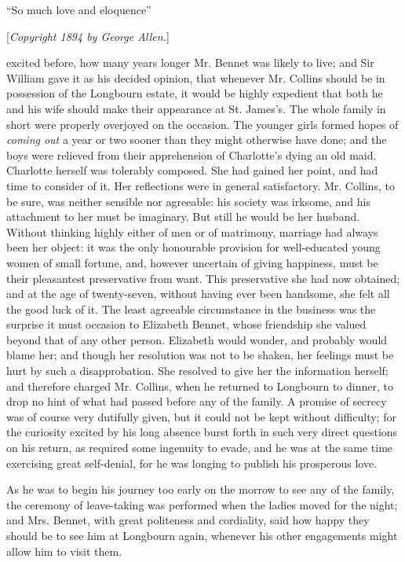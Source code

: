 \documentclass[12pt,openright]{book}
\begin{document}
“So much love and eloquence”

[\textit{Copyright 1894 by George Allen.}]

excited before, how many years longer Mr. Bennet was likely to live; and Sir William gave it as his decided opinion, that whenever Mr. Collins should be in possession of the Longbourn estate, it would be highly expedient that both he and his wife should make their appearance at St. James’s. The whole family in short were properly overjoyed on the occasion. The younger girls formed hopes of \textit{coming out} a year or two sooner than they might otherwise have done; and the boys were relieved from their apprehension of Charlotte’s dying an old maid. Charlotte herself was tolerably composed. She had gained her point, and had time to consider of it. Her reflections were in general satisfactory. Mr. Collins, to be sure, was neither sensible nor agreeable: his society was irksome, and his attachment to her must be imaginary. But still he would be her husband. Without thinking highly either of men or of matrimony, marriage had always been her object: it was the only honourable provision for well-educated young women of small fortune, and, however uncertain of giving happiness, must be their pleasantest preservative from want. This preservative she had now obtained; and at the age of twenty-seven, without having ever been handsome, she felt all the good luck of it. The least agreeable circumstance in the business was the surprise it must occasion to Elizabeth Bennet, whose friendship she valued beyond that of any other person. Elizabeth would wonder, and probably would blame her; and though her resolution was not to be shaken, her feelings must be hurt by such a disapprobation. She resolved to give her the information herself; and therefore charged Mr. Collins, when he returned to Longbourn to dinner, to drop no hint of what had passed before any of the family. A promise of secrecy was of course very dutifully given, but it could not be kept without difficulty; for the curiosity excited by his long absence burst forth in such very direct questions on his return, as required some ingenuity to evade, and he was at the same time exercising great self-denial, for he was longing to publish his prosperous love.

As he was to begin his journey too early on the morrow to see any of the family, the ceremony of leave-taking was performed when the ladies moved for the night; and Mrs. Bennet, with great politeness and cordiality, said how happy they should be to see him at Longbourn again, whenever his other engagements might allow him to visit them.
\end{document}
